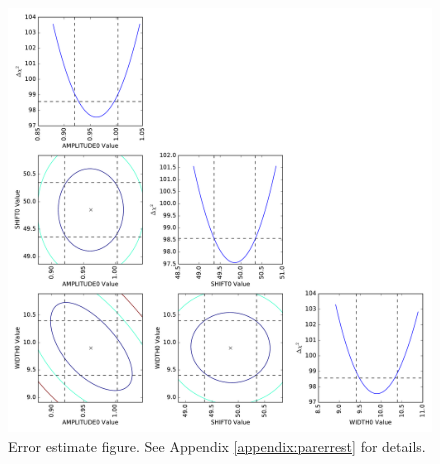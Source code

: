 \documentclass[twocolumn]{aastex62}
\begin{document}
\begin{figure}[!htp]
\includegraphics[scale=1,width=7in]{error_estimate_demonstration.pdf}
\caption{Error estimate figure.  See Appendix \ref{appendix:parerrest} for details.}
\label{fig:parerrestdemo}
\end{figure}
\end{document}
